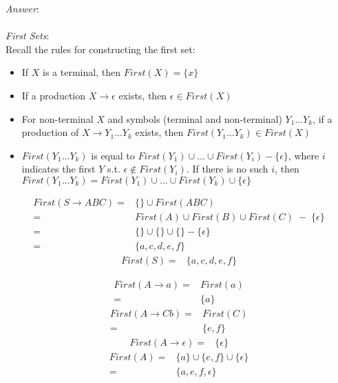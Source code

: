 \documentclass[fleqn]{article}
\begin{document}
\begin{enumerate}
  \textit{Answer}:\\\\
  \textit{First Sets}:\\
  Recall the rules for constructing the first set:
  \begin{itemize}
    \item If $X$ is a terminal, then $First(X) = \{x\}$
    \item If a production $X \rightarrow \epsilon$ exists, then $\epsilon \in First(X)$
    \item For non-terminal $X$ and symbols (terminal and non-terminal) $Y_{1}...Y_{k}$, if a production of  $X \rightarrow Y_{1}...Y_{k}$ exists, then $First(Y_{1}...Y_{k}) \in First(X)$
    \item $First(Y_{1}...Y_{k})$ is equal to $First(Y_{1}) \cup ... \cup First(Y_{i}) - \{\epsilon\}$, where $i$ indicates the first $Y$ s.t. $\epsilon \not\in First(Y_{i})$. If there is no such $i$, then $First(Y_{1}...Y_{k}) = First(Y_{1}) \cup ... \cup First(Y_{k}) \cup \{\epsilon\}$
  \end{itemize}
  \begin{align*}
    First(S \rightarrow ABC) =& \{\} \cup First(ABC)\\
                             =& First(A) \cup First(B) \cup First(C) \; - \; \{\epsilon\}\\
                             =& \{\} \cup \{\} \cup \{\} - \{\epsilon\}\\
                             =& \{a, c, d, e, f\}
  \end{align*}
  \begin{align*}
    First(S) =& \{a, c, d, e, f\}
  \end{align*}

  \begin{align*}
    First(A \rightarrow a) =& First(a)\\
                           =& \{a\}
  \end{align*}
  \begin{align*}
    First(A \rightarrow Cb) =& First(C)\\
                            =& \{e, f\}
  \end{align*}
  \begin{align*}
    First(A \rightarrow \epsilon) =& \{\epsilon\}
  \end{align*}
  \begin{align*}
    First(A) =& \{a\} \cup \{e, f\} \cup \{\epsilon\}\\
             =& \{a, e, f, \epsilon\}
  \end{align*}


\end{enumerate}
\end{document}
